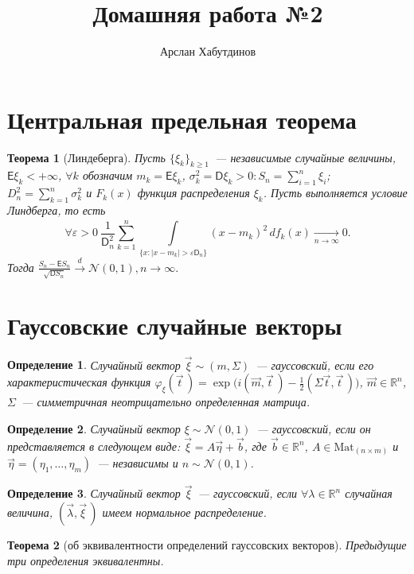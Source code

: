 \documentclass[11pt]{article}
\title{Домашняя работа №2}
\author{Арслан Хабутдинов}
\date{}
\newtheorem{thm}{Теорема}[section]
\newtheorem{dfn}{Определение}
\begin{document}
    \maketitle
    \section{Центральная предельная теорема}
    \begin{thm}[Линдеберга]
        Пусть $\{\xi_k\}_{k \geq 1}$~--- независимые случайные величины, $\mathsf{E}\xi_k < +\infty$, $\forall k$ обозначим $m_k = \mathsf{E}\xi_k$, $\sigma_k^2 = \mathsf{D}\xi_k > 0:S_n = \sum\limits_{i = 1}^n\xi_i$; $D_n^2 = \sum\limits_{k = 1}^n\sigma_k^2$ и $F_k(x)$ функция распределения $\xi_k$. Пусть выполняется условие Линдберга, то есть 
        $$
        \forall\varepsilon > 0~\frac{1}{\mathsf{D}_n^2} \sum\limits_{k = 1}^n \int\limits_{\{x:|x - m_k| > \varepsilon \mathsf{D}_n\}}^{} (x - m_k)^2  \,d f_k(x) \xrightarrow[n\rightarrow\infty]{}0.
        $$
        Тогда $\frac{S_n - \mathsf{E}S_n}{\sqrt{\mathsf{D}S_n}} \xrightarrow{d} \mathcal{N}(0,1), n \rightarrow \infty.$
    \end{thm}

    \section{Гауссовские случайные векторы}
    \begin{dfn}
        Случайный вектор $\vec \xi \sim (m, \Sigma)$~--- гауссовский, если его характеристическая функция $\varphi_\xi(\vec t\,) = \exp{\bigl(i(\vec m, \vec t\,)} - \frac{1}{2}(\Sigma \vec t, \vec t\,)\bigr)$, $\vec m \in \mathbb{R}^n$, $\Sigma$~--- симметричная неотрицательно определенная  матрица.
    \end{dfn}
    \begin{dfn}
        Случайный вектор $\xi \sim \mathcal{N}(0,1)$~--- гауссовский, если он представляется в следующем виде: $\vec \xi = A\vec \eta + \vec b$, где  $\vec b \in \mathbb{R}^n$, $A \in \text{Mat}_{(n \times m)}$ и $\vec \eta = (\eta_1, \dots, \eta_m)$~--- независимы и $n \sim \mathcal{N}(0,1)$.
    \end{dfn}
    \begin{dfn}
        Случайный вектор $\vec \xi$~--- гауссовский, если  $\forall \lambda \in \mathbb{R}^n$ случайная величина, $(\vec\lambda, \vec\xi\,)$ имеем нормальное распределение.
    \end{dfn}
    \begin{thm}[об эквивалентности определений гауссовских векторов]
        Предыдущие три определения эквивалентны.
    \end{thm}
\end{document}
